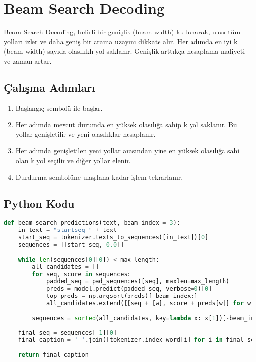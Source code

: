 \section{Beam Search Decoding}
Beam Search Decoding, belirli bir genişlik (beam width) kullanarak, olası tüm yolları izler ve daha geniş bir arama uzayını dikkate alır. Her adımda en iyi k (beam width) sayıda olasılıklı yol saklanır. Genişlik arttıkça hesaplama maliyeti  ve zaman artar.

\subsection{Çalışma Adımları}
\begin{enumerate}
	\item Başlangıç sembolü ile başlar.
	\item Her adımda mevcut durumda en yüksek olasılığa sahip k yol saklanır. Bu yollar genişletilir ve yeni olasılıklar hesaplanır.
	\item Her adımda genişletilen yeni yollar arasından yine en yüksek olasılığa sahi olan k yol seçilir ve diğer yollar elenir.
	\item Durdurma sembolüne ulaşılana kadar işlem tekrarlanır.
\end{enumerate}

\subsection{Python Kodu}

\begin{lstlisting}[language=Python]
def beam_search_predictions(text, beam_index = 3):
    in_text = "startseq " + text
    start_seq = tokenizer.texts_to_sequences([in_text])[0]
    sequences = [[start_seq, 0.0]]
    
    while len(sequences[0][0]) < max_length:
        all_candidates = []
        for seq, score in sequences:
            padded_seq = pad_sequences([seq], maxlen=max_length)
            preds = model.predict(padded_seq, verbose=0)[0]
            top_preds = np.argsort(preds)[-beam_index:]
            all_candidates.extend([[seq + [w], score + preds[w]] for w in top_preds])
        
        sequences = sorted(all_candidates, key=lambda x: x[1])[-beam_index:]
    
    final_seq = sequences[-1][0]
    final_caption = ' '.join([tokenizer.index_word[i] for i in final_seq if i not in [tokenizer.word_index["startseq"], tokenizer.word_index.get("endseq", 0), tokenizer.word_index.get("<OOV>", 0)]])
    
    return final_caption
\end{lstlisting}

\newpage 